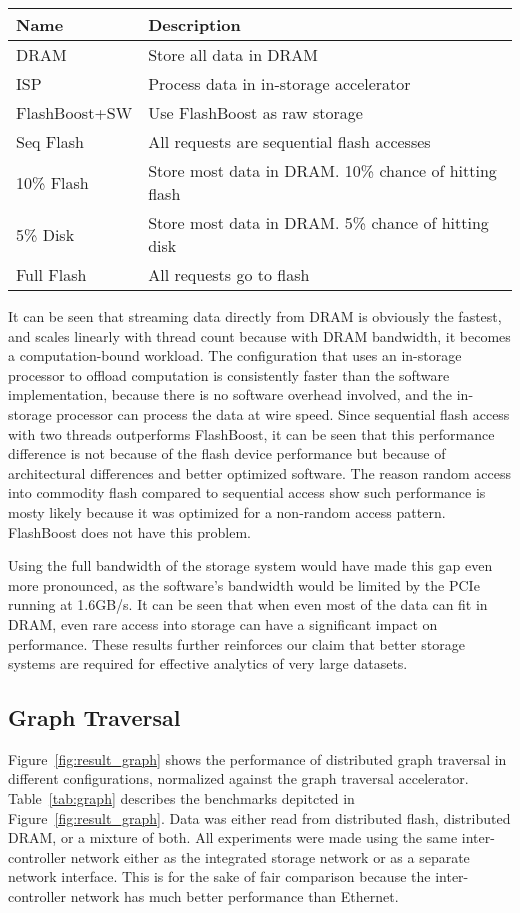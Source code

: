 \begin{tabular}{l | p{0.25\paperwidth}}
\label{tab:nearest_neighbor}
Name & Description \\
\hline \hline
DRAM & Store all data in DRAM \\
ISP & Process data in in-storage accelerator \\
FlashBoost+SW & Use FlashBoost as raw storage \\
Seq Flash & All requests are sequential flash accesses \\
10\% Flash & Store most data in DRAM. 10\% chance of hitting flash \\
5\% Disk & Store most data in DRAM. 5\% chance of hitting disk \\
Full Flash & All requests go to flash \\
\hline
\end{tabular}

It can be seen that streaming data directly from DRAM is obviously the fastest,
and scales linearly with thread count because with DRAM bandwidth, it becomes a
computation-bound workload. The configuration that uses an in-storage processor
to offload computation is consistently faster than the software implementation,
because there is no software overhead involved, and the in-storage processor can
process the data at wire speed. Since sequential flash access with two threads
outperforms FlashBoost, it can be seen that this performance difference is not
because of the flash device performance but because of architectural differences
and better optimized software. The reason random access into commodity flash
compared to sequential access show such performance is mosty likely because it
was optimized for a non-random access pattern. FlashBoost does not have this
problem.

Using the full bandwidth of the storage system would
have made this gap even more pronounced, as the software's bandwidth would be
limited by the PCIe running at 1.6GB/s. It can be seen that when even most of
the data can fit in DRAM, even rare access into storage can have a significant
impact on performance. These results further reinforces our claim that better
storage systems are required for effective analytics of very large datasets.


\subsection{Graph Traversal}

Figure~\ref{fig:result_graph} shows the performance of distributed graph traversal in
different configurations, normalized against the graph traversal
accelerator. Table~\ref{tab:graph} describes the benchmarks depitcted in
Figure~\ref{fig:result_graph}. Data was either read from distributed flash,
distributed DRAM, or a mixture of both. All experiments were made using the same
inter-controller network either as the integrated storage network or as a
separate network interface. This is for the sake of fair comparison because  the
inter-controller network has much better performance than Ethernet.

